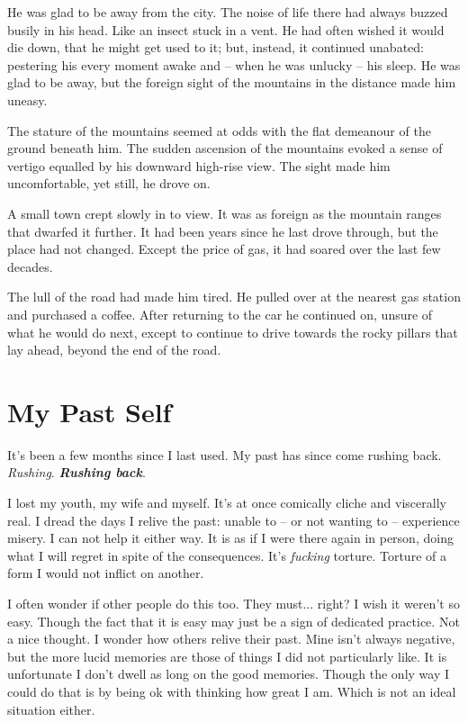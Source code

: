 \documentclass[fontsize=12pt,english]{scrreprt}
\begin{document}
He was glad to be away from the city. The noise of life there had
always buzzed busily in his head. Like an insect stuck in a vent. He
had often wished it would die down, that he might get used to it; but,
instead, it continued unabated: pestering his every moment awake and
-- when he was unlucky -- his sleep. He was glad to be away, but the
foreign sight of the mountains in the distance made him uneasy.

The stature of the mountains seemed at odds with the flat demeanour of
the ground beneath him. The sudden ascension of the mountains evoked a
sense of vertigo equalled by his downward high-rise view. The sight
made him uncomfortable, yet still, he drove on.

A small town crept slowly in to view. It was as foreign as the
mountain ranges that dwarfed it further. It had been years since he
last drove through, but the place had not changed. Except the price of
gas, it had soared over the last few decades.

The lull of the road had made him tired. He pulled over at the nearest
gas station and purchased a coffee. After returning to the car he
continued on, unsure of what he would do next, except to continue to
drive towards the rocky pillars that lay ahead, beyond the end of the
road.

\newpage

\section{My Past Self}

It's been a few months since I last used. My past has since come
rushing back. \textit{Rushing}. \textbf{\textit{Rushing back}}. 

I lost my youth, my wife and myself. It's at once comically cliche and
viscerally real. I dread the days I relive the past: unable to -- or
not wanting to -- experience misery. I can not help it either
way. It is as if I were there again in person, doing what I will
regret in spite of the consequences. It's \textit{fucking} torture. Torture of a form
I would not inflict on another.

I often wonder if other people do this too. They must... right? I wish
it weren't so easy. Though the fact that it is easy may just be a sign
of dedicated practice. Not a nice thought. I wonder how others relive
their past. Mine isn't always negative, but the more lucid memories
are those of things I did not particularly like. It is unfortunate I
don't dwell as long on the good memories. Though the only way I could
do that is by being ok with thinking how great I am. Which is not an
ideal situation either.
\end{document}
